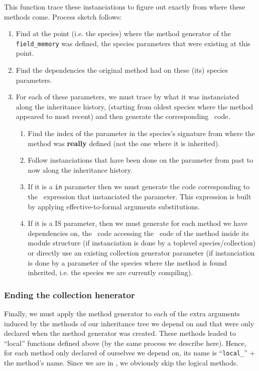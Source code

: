 {This function trace these instanciations to figure out exactly from
 where these methods come. Process sketch follows:
\begin{enumerate}
\item Find at the point (i.e. the species) where the method generator
 of the {\tt field\_memory} was defined, the species parameters that
 were existing at this point. 
\item Find the dependencies the original method had on these (its) species
    parameters.
\item For each of these parameters, we must trace by what it was
    instanciated along the inheritance history, (starting from oldest
    species where the method appeared to most recent) and then generate
    the corresponding \ocaml\ code.
    \begin{enumerate}
    \item Find the index of the parameter in the species's signature
    from where the method was {\bf really} defined (not the one where
    it is inherited).
    \item Follow instanciations that have been done on the parameter
    from past to now along the inheritance history.
    \item If it is a {\tt in} parameter then we must generate the code
    corresponding to the \focal\ expression that instanciated the
    parameter. This expression is built by applying
    effective-to-formal arguments substitutions.
    \item If it is a IS parameter, then we must generate for each
    method we have dependencies on, the \ocaml\ code accessing the
    \ocaml\ code of the method inside its module structure (if
    instanciation is done by a toplevel species/collection) or
    directly use an existing collection generator parameter (if
    instanciation is done by a parameter of the species where the
    method is found inherited, i.e. the species we are currently
    compiling).
    \end{enumerate}
\end{enumerate}


\subsubsection{Ending the collection henerator}
Finally, we must apply the method generator to each of the extra
arguments induced by the methods of our inheritance tree we depend on
and that were only declared when the method generator was
created. These methods leaded to ``local'' functions defined above (by
the same process we describe here). Hence, for each  method only
declared of ourselves we depend on, its name is ``{\tt local\_}'' +
the method's name. Since we are in \ocaml, we obviously skip the logical
methods.

}
